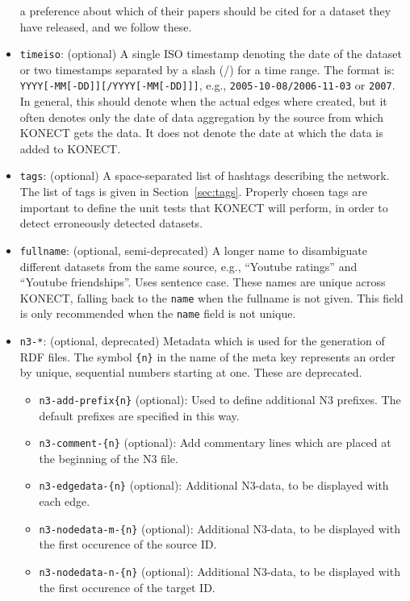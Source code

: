 \documentclass{article}
\begin{document}
\begin{itemize}
  a preference about which of their papers should be cited for a dataset
  they have released, and we follow these. 
\item \texttt{timeiso}: (optional) A single ISO timestamp denoting
  the date of the dataset or two timestamps separated by a
  slash (/) for a time range. The format is:
  \texttt{YYYY[-MM[-DD]][/YYYY[-MM[-DD]]]}, e.g., \texttt{2005-10-08/2006-11-03}
  or \texttt{2007}.
  In general, this should denote when the actual edges where created,
  but it often denotes only the date of data aggregation by the source
  from which KONECT gets the data.  It does not denote the date at which
  the data is added to KONECT. 
\item \texttt{tags}: (optional) A space-separated list of hashtags
  describing the network.  The list of tags is given in
  Section~\ref{sec:tags}.  
  Properly chosen tags are important to define the unit tests that
  KONECT will perform, in order to detect erroneously detected
  datasets. 
\item \texttt{fullname}: (optional, semi-deprecated) A longer name to disambiguate
  different datasets from the same source, e.g., ``Youtube
  ratings'' and ``Youtube friendships''.  Uses sentence case.  These
  names are unique across KONECT, falling back to the \texttt{name} when
  the fullname is not given.  This field is only recommended when the
  \texttt{name} field is not unique. 
\item \texttt{n3-*}: (optional, deprecated) Metadata which is used for the
  generation of RDF files. The symbol \texttt{\{n\}} in the name
  of the meta key represents an order by unique, sequential
  numbers starting at one.  These are deprecated. 
  \begin{itemize}
  \item \texttt{n3-add-prefix\{n\}} (optional):
    Used to define additional N3 prefixes. The
    default prefixes are specified in this way.
  \item \texttt{n3-comment-\{n\}} (optional): Add
    commentary lines which are placed at the
    beginning of the N3 file.
  \item \texttt{n3-edgedata-\{n\}} (optional):
    Additional N3-data, to be displayed with each
    edge.
  \item \texttt{n3-nodedata-m-\{n\}} (optional):
    Additional N3-data, to be displayed with the
    first occurence of the source ID.
  \item \texttt{n3-nodedata-n-\{n\}} (optional):
    Additional N3-data, to be displayed with the
    first occurence of the target ID.

\end{itemize}
\end{itemize}
\end{document}
